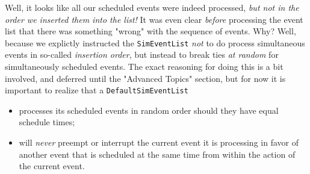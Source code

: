 \documentclass[12pt]{book}
\begin{document}
Well, it looks like all our scheduled events were indeed processed,
  {\em but not in the order we inserted them into the list!}
It was even clear {\em before\/} processing the event list that there
  was something "wrong" with the sequence of events.
Why?
Well, because we explictly instructed the \lstinline{SimEventList}
  {\em not\/} to do process simultaneous events in so-called
  {\em insertion order},
  but instead to break ties {\em at random\/} for
  simultaneously scheduled events.
The exact reasoning for doing this is a bit involved,
  and deferred until the "Advanced Topics" section,
  but for now it is important to realize that
  a \lstinline{DefaultSimEventList}
\begin{itemize}
  \item processes its scheduled events in random order
        should they have equal schedule times;
  \item will {\em never\/} preempt or interrupt the current event it is processing
        in favor of another event that is scheduled at the same time from within the
        action of the current event.
\end{itemize}
\end{document}
